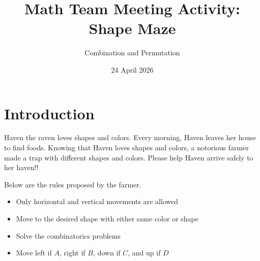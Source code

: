 \documentclass{article}
\title{\textbf{Math Team Meeting Activity: Shape Maze}}
\author{Combination and Permutation}
\date{24 April 2026}
\begin{document}
\maketitle

\section{Introduction}
Haven the raven loves shapes and colors. Every morning,
Haven leaves her house to find foods. Knowing that
Haven loves shapes and colors, a notorious farmer made
a trap with different shapes and colors. Please help
Haven arrive safely to her haven!!

Below are the rules proposed by the farmer.
\begin{itemize}
\item
Only horizontal and vertical movements are allowed

\item
Move to the desired shape with either same color
or shape

\item
Solve the combinatorics problems

\item
Move left if $A$, right if $B$, down if $C$, and up if $D$
\end{itemize}
\end{document}
